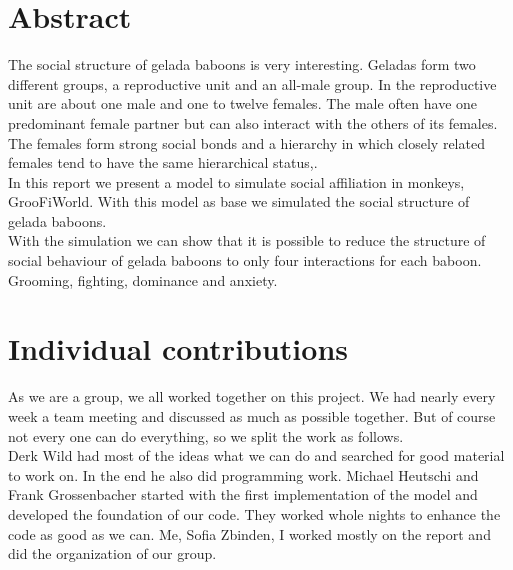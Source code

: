 \documentclass[11pt]{article}
\begin{document}
\tableofcontents
\listoffigures

\newpage



\section{Abstract}
The social structure of gelada baboons is very interesting. Geladas form two different groups, a reproductive unit and an all-male group. In the reproductive unit are about one male and one to twelve females. The male often have one predominant female partner but can also interact with the others of its females. The females form strong social bonds and  a hierarchy in which closely related females tend to have the same hierarchical status\cite{Dunbar1974},\cite{Dunbar1980}.
\\
In this report we present a model to simulate social affiliation in monkeys, GrooFiWorld\cite{Puga-Gonzalez2009}. With this model as base we simulated the social structure of gelada baboons.\\
With the simulation we can show that it is possible to reduce the structure of social behaviour of gelada baboons to only four interactions for each baboon. Grooming, fighting, dominance and anxiety.


\section{Individual contributions}
As we are a group, we all worked together on this project. We had nearly every week a team meeting and discussed as much as possible together. But of course not every one can do everything, so we split the work as follows.\\
Derk Wild had most of the ideas what we can do and searched for good material to work on. In the end he also did programming work. Michael Heutschi and Frank Grossenbacher started with the first implementation of the model and developed the foundation of our code. They worked whole nights to enhance the code as good as we can. Me, Sofia Zbinden, I worked mostly on the report and did the organization of our group. 
\end{document}
